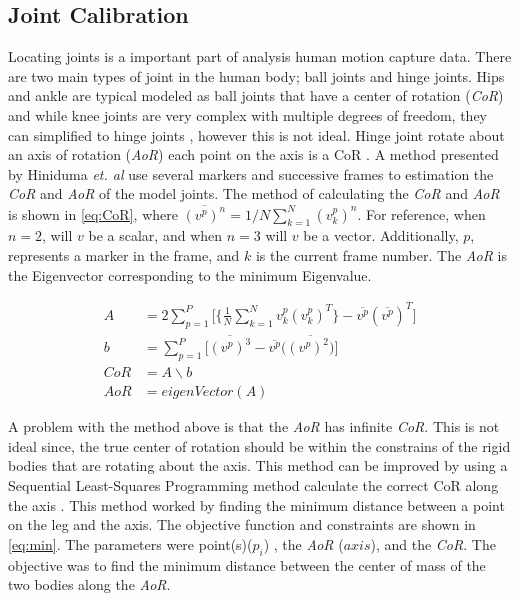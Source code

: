 \subsection{Joint Calibration}
Locating joints is a important part of analysis human motion capture data. There are two main types of joint in the human body; ball joints and hinge joints. Hips and ankle are typical modeled as ball joints that have a center of rotation (\textit{CoR}) and while knee joints are very complex with multiple degrees of freedom, they can simplified to hinge joints \cite{hefzy1996review}, however this is not ideal. Hinge joint rotate about an axis of rotation (\textit{AoR}) each point on the axis is a CoR \cite{halvorsen1999new}. A method presented by Hiniduma \textit{et. al} use several markers and successive frames to estimation the \textit{CoR} and \textit{AoR} of the model joints. The method of calculating the \textit{CoR} and \textit{AoR} is shown in \autoref{eq:CoR}, where $\overline{(v^p)^n} = 1/N \sum_{k=1}^N (v_k^p)^n$. For reference, when $n=2$, will $v$ be a scalar, and when $n=3$  will $v$ be a vector. Additionally, $p$, represents a marker in the frame, and $k$ is the current frame number. The \textit{AoR} is the Eigenvector corresponding to the minimum Eigenvalue.

\begin{equation}
    \begin{aligned}
        A &= 2 \sum^{P}_{p=1} \Bigg[ \bigg\{  \frac{1}{N} \sum^{N}_{k=1} v_k^p (v_k^p)^T \bigg\} -  \overline{v^p}(\overline{v^p})^T \Bigg] \\
        b &= \sum^{P}_{p=1} \Big[ \overline{(v^p)^3} - \overline{v^p} (\overline{(v^p)^2)} \Big] \\
        CoR &= A \backslash b\\
        AoR &=  eigenVector(A)
\end{aligned}
        \label{eq:CoR}
\end{equation}

A problem with the method above is that the \textit{AoR} has infinite \textit{CoR}. This is not ideal since, the true center of rotation should be within the constrains of the rigid bodies that are rotating about the axis. This method can be improved by using a Sequential Least-Squares Programming method calculate the correct CoR along the axis \cite{Least-Squares-Fitting}. This method worked by finding the minimum distance between a point on the leg and the axis. The objective function and constraints are shown in \autoref{eq:min}. The parameters were point(s)($p_i$) , the \textit{AoR} ($axis$), and the \textit{CoR}. The objective was to find the minimum distance between the center of mass of the two bodies along the \textit{AoR}. 

